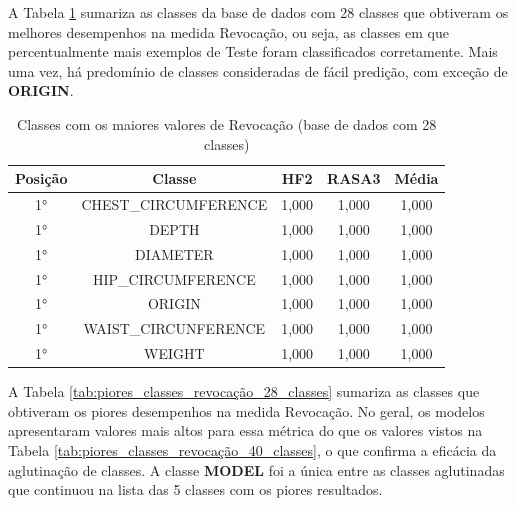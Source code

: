 \begin{table}[!ht]
\centering
\caption{Métricas de avaliação ponderadas pelo número de exemplos de cada classe (base de dados com 28 classes)}
\label{tab:metricas_gerais_28classes}
\end{table}

A Tabela \ref{tab:melhores_classes_revocação_28_classes} sumariza as classes da base de dados com 28 classes que obtiveram os melhores desempenhos na medida Revocação, ou seja, as classes em que percentualmente mais exemplos de Teste foram classificados corretamente. Mais uma vez, há predomínio de classes consideradas de fácil predição, com exceção de \textbf{ORIGIN}.

\begin{table}[!ht]
\centering
\caption{Classes com os maiores valores de Revocação (base de dados com 28 classes)}
\label{tab:melhores_classes_revocação_28_classes}
\begin{tabular}{|c|c|c|c|c|}
\hline
\textbf{Posição} & \textbf{Classe} & \textbf{HF2} & \textbf{RASA3} & \textbf{Média} \\
\hline
1° & CHEST\_CIRCUMFERENCE & 1,000 & 1,000 & 1,000 \\
\hline
1° & DEPTH & 1,000 & 1,000 & 1,000 \\
\hline
1° & DIAMETER & 1,000 & 1,000 & 1,000 \\
\hline
1° & HIP\_CIRCUMFERENCE & 1,000 & 1,000 & 1,000 \\
\hline
1° & ORIGIN & 1,000 & 1,000 & 1,000 \\
\hline
1° & WAIST\_CIRCUNFERENCE & 1,000 & 1,000 & 1,000 \\
\hline
1° & WEIGHT & 1,000 & 1,000 & 1,000 \\
\hline
\end{tabular}
\end{table}

A Tabela \ref{tab:piores_classes_revocação_28_classes} sumariza as classes que obtiveram os piores desempenhos na medida Revocação. No geral, os modelos apresentaram valores mais altos para essa métrica do que os valores vistos na Tabela \ref{tab:piores_classes_revocação_40_classes}, o que confirma a eficácia da aglutinação de classes. A classe \textbf{MODEL} foi a única entre as classes aglutinadas que continuou na lista das 5 classes com os piores resultados.

